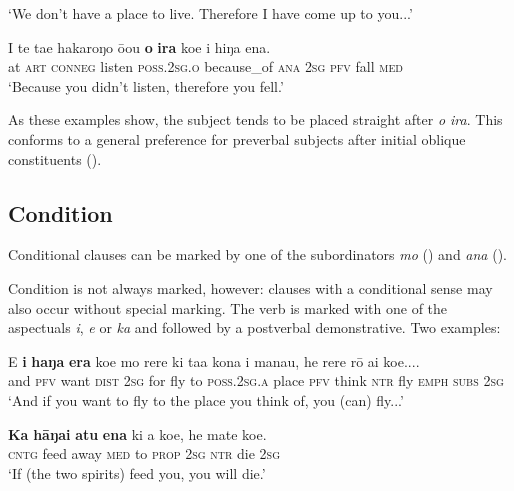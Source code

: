 \glt 
‘We don’t have a place to live. Therefore I have come up to you...’ \textstyleExampleref{[R229.210–211]}
\z

\ea\label{ex:11.261}
\gll {\ꞌ}I te ta{\ꞌ}e hakaroŋo ō{\ꞌ}ou \textbf{{\ꞌ}o} \textbf{ira} koe i hiŋa ena.\\
at \textsc{art} \textsc{conneg} listen \textsc{poss.2sg.o} because\_of \textsc{ana} \textsc{2sg} \textsc{pfv} fall \textsc{med}\\

\glt
‘Because you didn’t listen, therefore you fell.’ \textstyleExampleref{[R481.136]} 
\z

As these examples show, the subject tends to be placed straight after \textit{{\ꞌ}o ira}. This conforms to a general preference for preverbal subjects after initial oblique constituents ().
\subsection{Condition} \label{sec:11.6.6}
Conditional clauses can be marked by one of the subordinators \textit{mo} () and \textit{ana} (). 

Condition is not always marked, however: clauses with a conditional sense may also occur without special marking. The verb is marked with one of the aspectuals \textit{i}, \textit{e} or \textit{ka} and followed by a postverbal demonstrative. Two examples:

\ea\label{ex:11.262}
\gll {\ꞌ}E \textbf{i} \textbf{haŋa} \textbf{era} koe mo rere ki ta{\ꞌ}a kona i mana{\ꞌ}u,  he rere rō {\ꞌ}ai koe....\\
and \textsc{pfv} want \textsc{dist} \textsc{2sg} for fly to \textsc{poss.2sg.a} place \textsc{pfv} think  \textsc{ntr} fly \textsc{emph} \textsc{subs} \textsc{2sg}\\

\glt 
‘And if you want to fly to the place you think of, you (can) fly...’ \textstyleExampleref{[R378.006]} 
\z

\ea\label{ex:11.263}
\gll \textbf{Ka} \textbf{hāŋai} \textbf{atu} \textbf{ena} ki a koe, he mate koe. \\
\textsc{cntg} feed away \textsc{med} to \textsc{prop} \textsc{2sg} \textsc{ntr} die \textsc{2sg} \\

\glt
‘If (the two spirits) feed you, you will die.’ \textstyleExampleref{[R310.061]} 
\z


